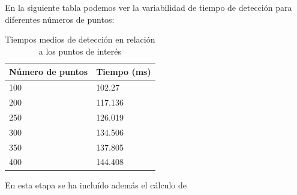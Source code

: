 En la siguiente tabla podemos ver la variabilidad de tiempo de detección para diferentes números de puntos:

\begin{table}
\caption{Tiempos medios de detección en relación a los puntos de interés}
\label{tab:detection-time}
\centering
\begin{tabular}{ l | l }
\toprule
\textbf{Número de puntos} & \textbf{Tiempo (ms)}\\
\hline\hline
100 & 102.27\\
\hline
200 & 117.136\\
\hline
250 & 126.019\\
\hline
300 & 134.506\\
\hline
350 & 137.805\\
\hline
400 & 144.408\\
\bottomrule
\end{tabular}
\end{table}

En esta etapa se ha incluído además el cálculo de 
